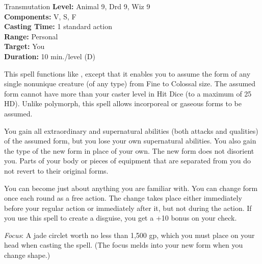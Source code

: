 {Transmutation}
{
	\textbf{Level:}
	Animal 9, Drd 9, Wiz 9\\
	\textbf{Components:}
	V, S, F\\
	\textbf{Casting Time:}
	1 standard action\\
	\textbf{Range:}
	Personal\\
	\textbf{Target:}
	You\\
	\textbf{Duration:}
	10 min./level (D)\\
}
{
	This spell functions like , except that it enables you to assume the form of any single nonunique creature (of any type) from Fine to Colossal size. The assumed form cannot have more than your caster level in Hit Dice (to a maximum of 25 HD). Unlike polymorph, this spell allows incorporeal or gaseous forms to be assumed.

	You gain all extraordinary and supernatural abilities (both attacks and qualities) of the assumed form, but you lose your own supernatural abilities. You also gain the type of the new form in place of your own. The new form does not disorient you. Parts of your body or pieces of equipment that are separated from you do not revert to their original forms.

	You can become just about anything you are familiar with. You can change form once each round as a free action. The change takes place either immediately before your regular action or immediately after it, but not during the action. If you use this spell to create a disguise, you get a +10 bonus on your  check.

	\textit{Focus}:
	A jade circlet worth no less than 1,500 gp, which you must place on your head when casting the spell. (The focus melds into your new form when you change shape.)

}
